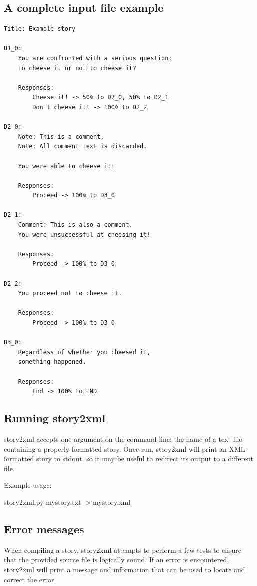 \documentclass[12pt,letterpaper]{article}
\begin{document}
 \subsection{A complete input file example}
 \begin{lstlisting}
Title: Example story

D1_0:
    You are confronted with a serious question: 
    To cheese it or not to cheese it?
    
    Responses:
        Cheese it! -> 50% to D2_0, 50% to D2_1
        Don't cheese it! -> 100% to D2_2

D2_0:
    Note: This is a comment.
    Note: All comment text is discarded.
    
    You were able to cheese it!
    
    Responses:
        Proceed -> 100% to D3_0

D2_1:
    Comment: This is also a comment.
    You were unsuccessful at cheesing it!
    
    Responses:
        Proceed -> 100% to D3_0

D2_2:
    You proceed not to cheese it.
    
    Responses:
        Proceed -> 100% to D3_0
        
D3_0:
    Regardless of whether you cheesed it, 
    something happened.
    
    Responses:
        End -> 100% to END
 \end{lstlisting}
 
 \subsection{Running story2xml}
 story2xml accepts one argument on the command line: the name of a text file containing a properly formatted story.
 Once run, story2xml will print an XML-formatted story to stdout, so it may be useful to redirect its output to a different
 file. 
 
 Example usage:
 \begin{center}
 story2xml.py mystory.txt $>$mystory.xml
 \end{center}
 
 \subsection{Error messages}
 When compiling a story, story2xml attempts to perform a few tests to ensure that the provided source file is logically sound.
 If an error is encountered, story2xml will print a message and information that can be used to locate and correct the error.
 
\end{document}
